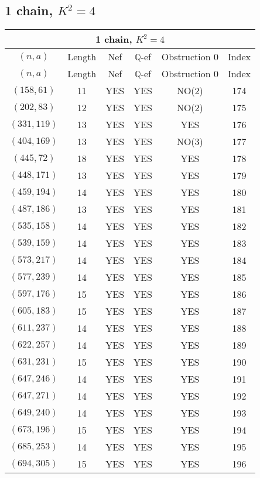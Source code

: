 \subsection{1 chain, $K^2 = 4$}
\begin{longtable}{|c|c|c|c|c|c|}
\hline
\multicolumn{6}{|c|}{1 chain, $K^2 = 4$}\\
\hline
$(n,a)$ & Length & Nef & $\mathbb Q$-ef & Obstruction 0 & Index\\
\hline
\endfirsthead

\hline
$(n,a)$ & Length & Nef & $\mathbb Q$-ef & Obstruction 0 & Index\\
\hline
\endhead
\hline
\endfoot

$(158, 61)$ & 11 & YES & YES & NO(2) & 174\\
$(202, 83)$ & 12 & YES & YES & NO(2) & 175\\
$(331, 119)$ & 13 & YES & YES & YES & 176\\
$(404, 169)$ & 13 & YES & YES & NO(3) & 177\\
$(445, 72)$ & 18 & YES & YES & YES & 178\\
$(448, 171)$ & 13 & YES & YES & YES & 179\\
$(459, 194)$ & 14 & YES & YES & YES & 180\\
$(487, 186)$ & 13 & YES & YES & YES & 181\\
$(535, 158)$ & 14 & YES & YES & YES & 182\\
$(539, 159)$ & 14 & YES & YES & YES & 183\\
$(573, 217)$ & 14 & YES & YES & YES & 184\\
$(577, 239)$ & 14 & YES & YES & YES & 185\\
$(597, 176)$ & 15 & YES & YES & YES & 186\\
$(605, 183)$ & 15 & YES & YES & YES & 187\\
$(611, 237)$ & 14 & YES & YES & YES & 188\\
$(622, 257)$ & 14 & YES & YES & YES & 189\\
$(631, 231)$ & 15 & YES & YES & YES & 190\\
$(647, 246)$ & 14 & YES & YES & YES & 191\\
$(647, 271)$ & 14 & YES & YES & YES & 192\\
$(649, 240)$ & 14 & YES & YES & YES & 193\\
$(673, 196)$ & 15 & YES & YES & YES & 194\\
$(685, 253)$ & 14 & YES & YES & YES & 195\\
$(694, 305)$ & 15 & YES & YES & YES & 196\\

\end{longtable}
